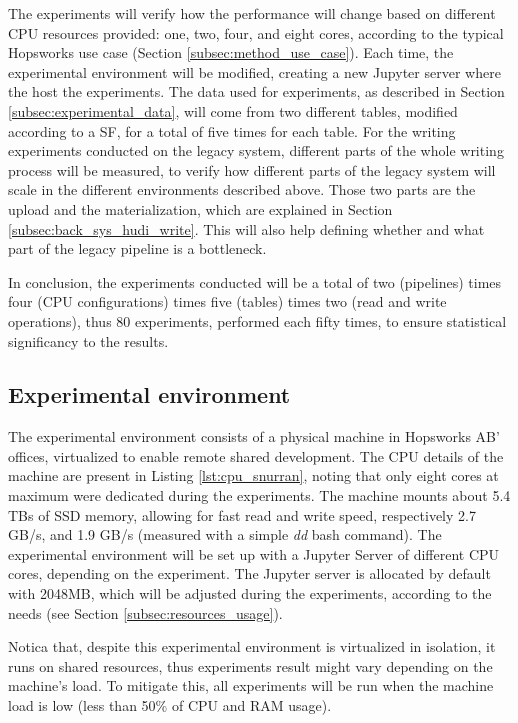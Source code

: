 The experiments will verify how the performance will change based on different \gls{CPU} resources provided: one, two, four, and eight cores, according to the typical Hopsworks use case (Section \ref{subsec:method_use_case}). Each time, the experimental environment will be modified, creating a new Jupyter server where the host the experiments. The data used for experiments, as described in Section \ref{subsec:experimental_data}, will come from two different tables, modified according to a \gls{SF}, for a total of five times for each table. For the writing experiments conducted on the legacy system, different parts of the whole writing process will be measured, to verify how different parts of the legacy system will scale in the different environments described above. Those two parts are the upload and the materialization, which are explained in Section \ref{subsec:back_sys_hudi_write}. This will also help defining whether and what part of the legacy pipeline is a bottleneck.

In conclusion, the experiments conducted will be a total of two (pipelines) times four (\gls{CPU} configurations) times five (tables) times two (read and write operations), thus 80 experiments, performed each fifty times, to ensure statistical significancy to the results.



\subsection{Experimental environment}
\label{subsec:experimental_env}

The experimental environment consists of a physical machine in Hopsworks AB' offices, virtualized to enable remote shared development. The \gls{CPU} details of the machine are present in Listing \ref{lst:cpu_snurran}, noting that only eight cores at maximum were dedicated during the experiments. The machine mounts about 5.4 TBs of \gls{SSD} memory, allowing for fast read and write speed, respectively 2.7 GB/s, and 1.9 GB/s (measured with a simple \textit{dd} bash command). The experimental environment will be set up with a Jupyter Server of different CPU cores, depending on the experiment. The Jupyter server is allocated by default with 2048MB, which will be adjusted during the experiments, according to the needs (see Section \ref{subsec:resources_usage}).

Notica that, despite this experimental environment is virtualized in isolation, it runs on shared resources, thus experiments result might vary depending on the machine's load. To mitigate this, all experiments will be run when the machine load is low (less than 50\% of \gls{CPU} and \gls{RAM} usage).

